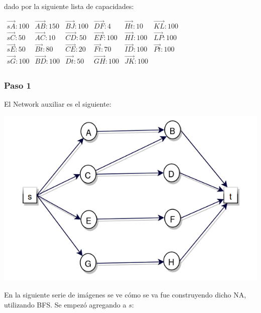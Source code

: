 \documentclass[10pt,a4paper]{article}
\begin{document}
dado por la siguiente lista de capacidades:

$\begin{array}{llllll} \overrightarrow{sA}: 100& \overrightarrow{AB}: 150&\overrightarrow{BJ}: 100&\overrightarrow{DF}: 4&\overrightarrow{Ht}:10&\overrightarrow{KL}: 100\\ \overrightarrow{sC}: 50& \overrightarrow{AC}: 10&\overrightarrow{CD}: 50&\overrightarrow{EF}: 100&\overrightarrow{HI}: 100&\overrightarrow{LP}: 100\\ \overrightarrow{sE}: 50& \overrightarrow{Bt}: 80&\overrightarrow{CE}: 20&\overrightarrow{Ft}: 70&\overrightarrow{ID}: 100&\overrightarrow{Pt}: 100\\ \overrightarrow{sG}:100& \overrightarrow{BD}: 100&\overrightarrow{Dt}:50&\overrightarrow{GH}: 100&\overrightarrow{JK}: 100&\\ \end{array}$

\subsubsection*{Paso 1}

El Network auxiliar es el siguiente:

\begin{center}

    \begin{adjustbox}{max size={\textwidth}{\textheight}}
        \includegraphics{definitions/D0.jpg}
        \end{adjustbox}
    
\end{center}

En la siguiente serie de imágenes se ve cómo se va fue construyendo dicho NA, utilizando BFS. Se empezó agregando a $s$:
\end{document}
